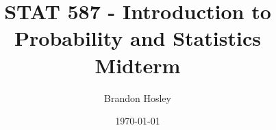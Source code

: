 \documentclass[answers]{exam}
\title{STAT 587 - Introduction to Probability and Statistics%
	\\ Midterm}
\author{Brandon Hosley}
\date{\today}
\begin{document}
\maketitle
\begin{questions}

\question 

\begin{solution}

\end{solution}

\setcounter{question}{2}

\question 

\begin{solution}

\end{solution}

\setcounter{question}{4}

\clearpage

\question 

\begin{solution} \\

\end{solution}

\question 

\begin{solution} 

\end{solution}

\clearpage


\end{questions}
\end{document}
